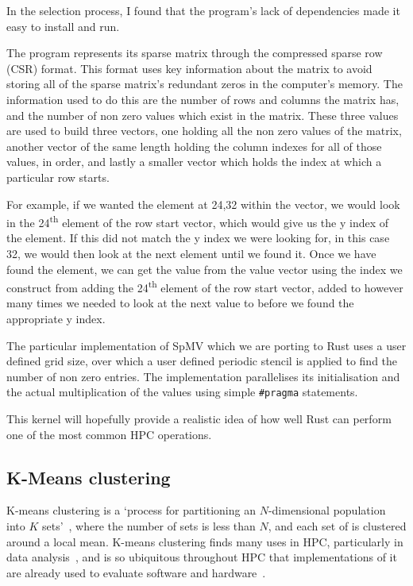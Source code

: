 In the selection process, I found that the program's lack of dependencies made it easy to install and run.

The program represents its sparse matrix through the compressed sparse row (CSR) format. This format uses key information about the matrix to avoid storing all of the sparse matrix's redundant zeros in the computer's memory. The information used to do this are the number of rows and columns the matrix has, and the number of non zero values which exist in the matrix. These three values are used to build three vectors, one holding all the non zero values of the matrix, another vector of the same length holding the column indexes for all of those values, in order, and lastly a smaller vector which holds the index at which a particular row starts.

For example, if we wanted the element at 24,32 within the vector, we would look in the 24\textsuperscript{th} element of the row start vector, which would give us the y index of the element. If this did not match the y index we were looking for, in this case 32, we would then look at the next element until we found it. Once we have found the element, we can get the value from the value vector using the index we construct from adding the 24\textsuperscript{th} element of the row start vector, added to however many times we needed to look at the next value to before we found the appropriate y index.

The particular implementation of SpMV which we are porting to Rust uses a user defined grid size, over which a user defined periodic stencil is applied to find the number of non zero entries. The implementation parallelises its initialisation and the actual multiplication of the values using simple \texttt{\#pragma} statements.

This kernel will hopefully provide a realistic idea of how well Rust can perform one of the most common HPC operations.

\subsection{K-Means clustering}

K-means clustering is a `process for partitioning an $N$-dimensional population into $K$ sets'~\cite{macqueen1967}, where the number of sets is less than $N$, and each set of is clustered around a local mean. K-means clustering finds many uses in HPC, particularly in data analysis~\cite{DBLP:journals/corr/ChakrabortyND14a, ordovas2014fast}, and is so ubiquitous throughout HPC that implementations of it are already used to evaluate software and hardware~\cite{Yang2014}.


